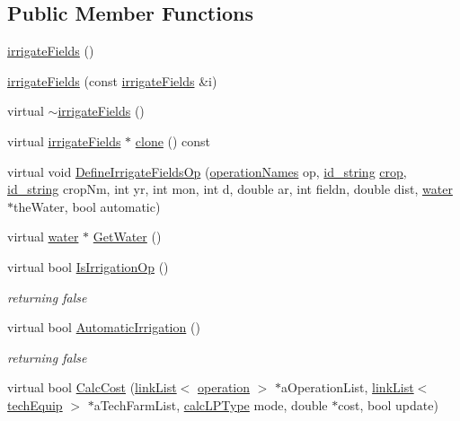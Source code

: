 \subsection*{Public Member Functions}
\begin{DoxyCompactItemize}
\item 
\hyperlink{classirrigate_fields_a5033ec5eccc0361ee9253addbdee93bb}{irrigateFields} ()
\item 
\hyperlink{classirrigate_fields_a73b818c0ab612132a1235cde4a0dd517}{irrigateFields} (const \hyperlink{classirrigate_fields}{irrigateFields} \&i)
\item 
virtual \hyperlink{classirrigate_fields_ac5ca7243c3b7db8724565012459482e7}{$\sim$irrigateFields} ()
\item 
virtual \hyperlink{classirrigate_fields}{irrigateFields} $\ast$ \hyperlink{classirrigate_fields_a162b39c6de0effa998c14fa4516da08b}{clone} () const 
\item 
virtual void \hyperlink{classirrigate_fields_ac25be5a54804ed89dd06f30b233240e1}{DefineIrrigateFieldsOp} (\hyperlink{operation_names_8h_a77d40de6faa131199a5de6df3d9c7e3d}{operationNames} op, \hyperlink{classfield_operation_fields_a65517d20c09329343461131d07d48ecb}{id\_\-string} \hyperlink{classcrop}{crop}, \hyperlink{classfield_operation_fields_a65517d20c09329343461131d07d48ecb}{id\_\-string} cropNm, int yr, int mon, int d, double ar, int fieldn, double dist, \hyperlink{classwater}{water} $\ast$theWater, bool automatic)
\item 
virtual \hyperlink{classwater}{water} $\ast$ \hyperlink{classirrigate_fields_a01abb4e549487714b388c0923c390b3a}{GetWater} ()
\item 
virtual bool \hyperlink{classirrigate_fields_a5ec3ea58a4f844b81c394155e332829c}{IsIrrigationOp} ()
\begin{DoxyCompactList}\small\item\em returning false \item\end{DoxyCompactList}\item 
virtual bool \hyperlink{classirrigate_fields_a288149c6a4e9bc3d60cf8f3494aa274f}{AutomaticIrrigation} ()
\begin{DoxyCompactList}\small\item\em returning false \item\end{DoxyCompactList}\item 
virtual bool \hyperlink{classirrigate_fields_a2180e7648439e025e85c304388260f14}{CalcCost} (\hyperlink{classlink_list}{linkList}$<$ \hyperlink{classoperation}{operation} $>$ $\ast$aOperationList, \hyperlink{classlink_list}{linkList}$<$ \hyperlink{classtech_equip}{techEquip} $>$ $\ast$aTechFarmList, \hyperlink{typer_8h_af05cf854fc14086a0d6404be5ae9813f}{calcLPType} mode, double $\ast$cost, bool update)
\end{DoxyCompactItemize}


